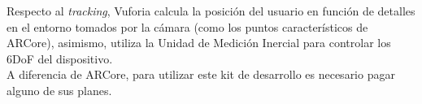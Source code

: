Respecto al \textit{tracking}, Vuforia calcula la posición del usuario en función de detalles en el entorno tomados por la cámara (como los puntos característicos de ARCore), asimismo, utiliza la Unidad de Medición Inercial para controlar los 6DoF del dispositivo.\\

A diferencia de ARCore, para utilizar este kit de desarrollo es necesario pagar alguno de sus planes. 
